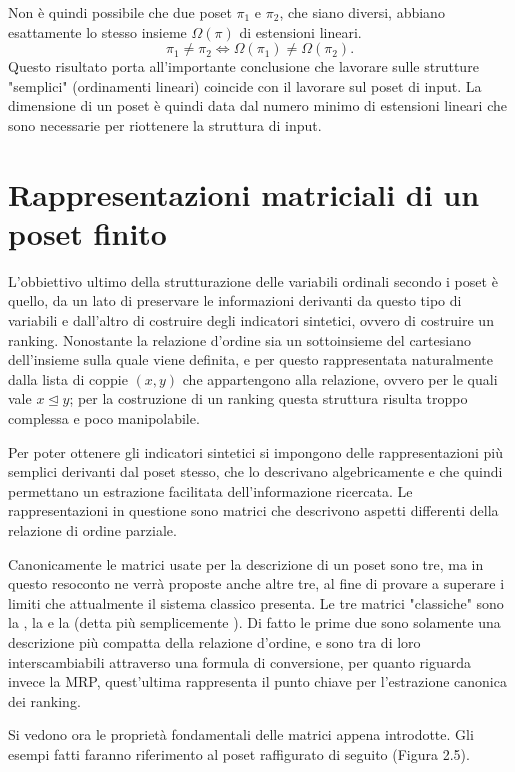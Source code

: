 \documentclass{report}
\begin{document}
Non è quindi possibile che due poset $\pi_1$ e $\pi_2$, che siano diversi, abbiano esattamente lo stesso insieme $\Omega(\pi)$ di estensioni lineari.
\[\pi_1\neq\pi_2 \Leftrightarrow \Omega(\pi_1)\neq\Omega(\pi_2).\]
Questo risultato porta all'importante conclusione che lavorare sulle strutture "semplici" (ordinamenti lineari) coincide con il lavorare sul poset di input. La dimensione di un poset è quindi data dal numero minimo di estensioni lineari che sono necessarie per riottenere la struttura di input.


\section{Rappresentazioni matriciali di un poset finito}
L'obbiettivo ultimo della strutturazione delle variabili ordinali secondo i poset è quello, da un lato di preservare le informazioni derivanti da questo tipo di variabili e dall'altro di costruire degli indicatori sintetici, ovvero di costruire un ranking. Nonostante la relazione d'ordine sia un sottoinsieme del cartesiano dell'insieme sulla quale viene definita, e per questo rappresentata naturalmente dalla lista di coppie $(x, y)$ che appartengono alla relazione, ovvero per le quali vale $x \unlhd y$; per la costruzione di un ranking questa struttura risulta troppo complessa e poco manipolabile. 


Per poter ottenere gli indicatori sintetici si impongono delle rappresentazioni più semplici derivanti dal poset stesso, che lo descrivano algebricamente e che quindi permettano un estrazione facilitata dell'informazione ricercata. Le rappresentazioni in questione sono matrici che descrivono aspetti differenti della relazione di ordine parziale. 


Canonicamente le matrici usate per la descrizione di un poset sono tre, ma in questo resoconto ne verrà proposte anche altre tre, al fine di provare a superare i limiti che attualmente il sistema classico presenta. Le tre matrici "classiche" sono la , la  e la  (detta più semplicemente ). Di fatto le prime due sono solamente una descrizione più compatta della relazione d'ordine, e sono tra di loro interscambiabili attraverso una formula di conversione, per quanto riguarda invece la MRP, quest'ultima rappresenta il punto chiave per l'estrazione canonica dei ranking.


Si vedono ora le proprietà fondamentali delle matrici appena introdotte. Gli esempi fatti faranno riferimento al poset raffigurato di seguito (Figura 2.5).
\end{document}
